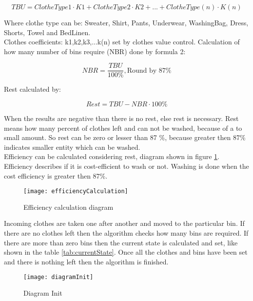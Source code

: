 \begin{equation}
TBU=ClotheType1\cdot K1+ClotheType2\cdot K2+...+ClotheType(n)\cdot K(n) \label{eq:eq1}
\end{equation}

Where clothe type can be: Sweater, Shirt, Pants, Underwear, WashingBag, Dress, Shorts, Towel and BedLinen. 
\\
Clothes coefficients: k1,k2,k3,...k(n) set by clothes value control.
Calculation of how many number of bins require (NBR) done by formula 2:  

\begin{equation}
NBR=\frac{TBU}{100\%},\textrm{Round by 87\%} \label{eq:eq2}
\end{equation}

Rest calculated by:

\begin{equation}
Rest=TBU-NBR\cdot 100\% \label{eq:eq3}
\end{equation}

When the results are negative than there is no rest, else rest is necessary. Rest means how many percent of clothes left and can not be washed, because of a to small amount. So rest can be zero or lesser than 87 \%, because greater then 87\% indicates smaller entity which can be washed.
\\
Efficiency can be calculated considering rest, diagram shown in figure \ref{fig:efficiencyCalculation}. Efficiency describes if it is cost-efficient to wash or not. Washing is done when the cost efficiency is greater then 87\%.

\begin{figure}[h]
	\centering
		\texttt{[image: efficiencyCalculation]}
	\caption{Efficiency calculation diagram}
	\label{fig:efficiencyCalculation}
\end{figure}

Incoming clothes are taken one after another and moved to the particular bin. If there are no clothes left then the algorithm checks how many bins are required. If there are more than zero bins then the current state is calculated and set, like shown in the table \ref{tab:currentState}. Once all the clothes and bins have been set and there is nothing left then the algorithm is finished. \newpage

\begin{figure}[h]
	\centering
		\texttt{[image: diagramInit]}
	\caption{Diagram Init}
	\label{fig:planning}
\end{figure}


